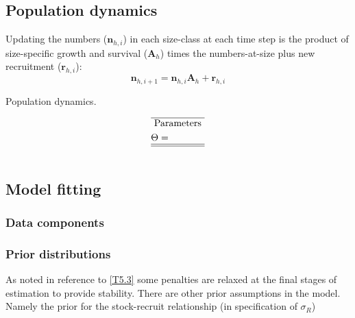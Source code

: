 \documentclass[12pt,letterpaper]{article}
\newcounter{saveEq}
\def\putEq{\setcounter{saveEq}{\value{equation}}}
\def\getEq{\setcounter{equation}{\value{saveEq}}}
\def\tableEq{ %
    \putEq \setcounter{equation}{0}
    \renewcommand{\theequation}{T\arabic{table}.\arabic{equation}}
    \vspace{-5mm}
    }
\def\normalEq{ %
    \getEq
    \renewcommand{\theequation}{\arabic{section}.\arabic{equation}}}
\begin{document}

    \subsection*{Population dynamics} %
    \label{sub:population_dynamics}
    Updating the numbers ($\bm{n}_{h,i}$) in each size-class at each time step is the product of size-specific growth and survival ($\bm{A}_h$) times the numbers-at-size plus new recruitment ($\bm{r}_{h,i}$):
    \begin{equation}\label{eq:update_numbers_at_size}
      \bm{n}_{h,i+1} = \bm{n}_{h,i} \bm{A}_h + \bm{r}_{h,i}
    \end{equation}

    \begin{table}
    \centering
    \caption{ Population dynamics. }
    \label{tab:population_dynamics}
    \tableEq
    \begin{align}
      \hline \nonumber
      &\mbox{ Parameters } \\
      &\Theta = \\
      \hline \hline \nonumber
    \end{align}
    \normalEq
    \end{table}
    
    \subsection*{Model fitting} %
    \label{sub:Model fitting}
    \subsubsection*{Data components}
    \label{subsub:Data components}
    \subsubsection*{Prior distributions}
    \label{subsub:Prior distributions}
    As noted in reference to \eqref{T5.3} some penalties are relaxed at the final stages of estimation to provide stability. There are other prior assumptions in the model. Namely the prior for the stock-recruit relationship (in specification of $\sigma_{R}$)
\end{document}
